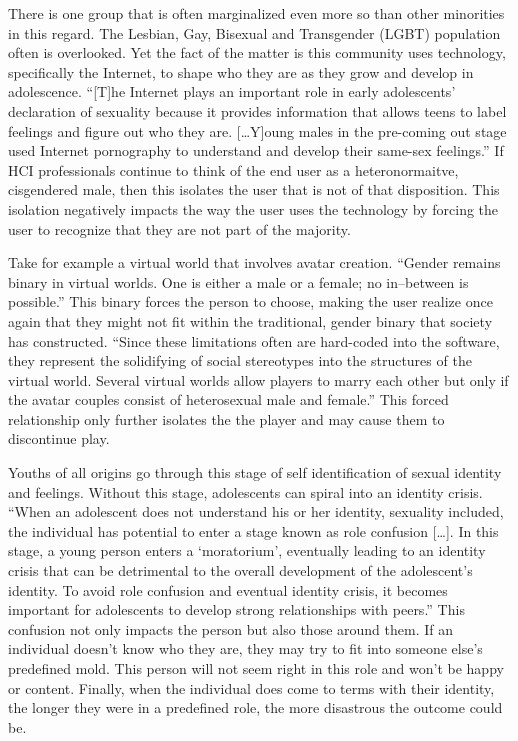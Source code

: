 \documentclass{acmsmall}
\begin{document}
There is one group that is often marginalized even more so than other minorities in this regard. The Lesbian, Gay, Bisexual and Transgender (LGBT) population often is overlooked. Yet the fact of the matter is this community uses technology, specifically the Internet, to shape who they are as they grow and develop in adolescence. ``[T]he Internet plays an important role in early adolescents' declaration of sexuality because it provides information that allows teens to label feelings and figure out who they are. [\ldots Y]oung males in the pre-coming out stage used Internet pornography to understand and develop their same-sex feelings.'' \cite{bond13} If HCI professionals continue to think of the end user as a heteronormaitve, cisgendered male, then this isolates the user that is not of that disposition. This isolation negatively impacts the way the user uses the technology by forcing the user to recognize that they are not part of the majority.

Take for example a virtual world that involves avatar creation. ``Gender remains binary in virtual worlds. One is either a male or a female; no in–between is possible.'' \cite{blodgett07} This binary forces the person to choose, making the user realize once again that they might not fit within the traditional, gender binary that society has constructed.  ``Since these limitations often are hard-coded into the software, they represent the solidifying of social stereotypes into the structures of the virtual world. Several virtual worlds allow players to marry each other but only if the avatar couples consist of heterosexual male and female.'' \cite{blodgett07} This forced relationship only further isolates the the player and may cause them to discontinue play.

Youths of all origins go through this stage of self identification of sexual identity and feelings. Without this stage, adolescents can spiral into an identity crisis. ``When an adolescent does not understand his or her identity, sexuality included, the individual has potential to enter a stage known as role confusion [\ldots]. In this stage, a young person enters a `moratorium', eventually leading to an identity crisis that can be detrimental to the overall development of the adolescent's identity. To avoid role confusion and eventual identity crisis, it becomes important for adolescents to develop strong relationships with peers.'' \cite{bond13} This confusion not only impacts the person but also those around them. If an individual doesn't know who they are, they may try to fit into someone else's predefined mold. This person will not seem right in this role and won't be happy or content. Finally, when the individual does come to terms with their identity, the longer they were in a predefined role, the more disastrous the outcome could be.
\end{document}

